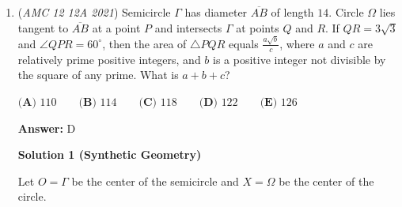 \begin{enumerate}
Denote the center square as $C$, the edge squares as $E$, and the corner squares as $Co$. On the first move, the probability of Frieda on the $C$ is $0$ because she's moving away from the center square. The probability she's on $E$ is $1$ because no matter which direction she goes, she's always going to end up on an edge square. Probability she's on $Co$ equals $1 - (0 + 1) = 0$ by complementary counting. Notice that the probability Frieda will be on the $C$ can be expressed as: $P(C) = \frac{1}{4} \cdot P(E from last move)$ because one-fourth of the moves Frieda takes from an edge square sends her back to $C$. Also, she can't reach $C$ from a $Co$ square. Now $P(E) = P(C from last move) + \frac{1}{4} \cdot P(E from last move)$ simply from the same logic. We can find $P(Co)$ using complementary counting. On the second move, $P(C) = \frac{1}{4} \cdot 1 = \frac{1}{4}$ and $P(E) = 0 + \frac{1}{4} \cdot 1 = \frac{1}{4}$. Now $P(Co) = 1 - \frac{1}{4} - \frac{1}{4} = \frac{1}{2}$. On the third move, $P(C) = \frac{1}{4} \cdot \frac{1}{4} = \frac{1}{16}$ and $P(E) = \frac{1}{4} + \frac{1}{4} \cdot \frac{1}{4} = \frac{5}{16}$. $P(Co) = 1 - \frac{1}{16} - \frac{5}{16} = \frac{5}{8}$. Now on the fourth and last move, $P(C) = \frac{1}{4} \cdot \frac{5}{16} = \frac{5}{64}$ and $P(E) = \frac{1}{16} + \frac{1}{4} \cdot \frac{5}{16} = \frac{9}{64}$. Finally, $P(Co) = 1 - \frac{5}{64} - \frac{9}{64} = 1 - \frac{7}{32} = \frac{25}{32}$.

 Note: This video solution is not available

 


	\item (\textit{AMC 12 12A 2021}) Semicircle $\Gamma$ has diameter $\overline{AB}$ of length $14$. Circle $\Omega$ lies tangent to $\overline{AB}$ at a point $P$ and intersects $\Gamma$ at points $Q$ and $R$. If $QR=3\sqrt3$ and $\angle QPR=60^\circ$, then the area of $\triangle PQR$ equals $\frac{a\sqrt{b}}{c}$, where $a$ and $c$ are relatively prime positive integers, and $b$ is a positive integer not divisible by the square of any prime. What is $a+b+c$?


 $\textbf{(A) }110 \qquad \textbf{(B) }114 \qquad \textbf{(C) }118 \qquad \textbf{(D) }122\qquad \textbf{(E) }126$

 \textbf{Answer: }D



\textbf{Solution 1 (Synthetic Geometry)}

Let $O=\Gamma$ be the center of the semicircle and $X=\Omega$ be the center of the circle. 


\end{enumerate}
